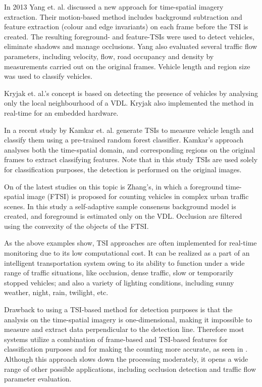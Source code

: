 In 2013 Yang et. al. discussed a new approach for time-spatial imagery extraction\cite{Yang2013a}.
Their motion-based method includes background subtraction and feature extraction (colour and edge invariants) on each frame before the TSI is created.
The resulting foreground- and feature-TSIs were used to detect vehicles, eliminate shadows and manage occlusions.
Yang also evaluated several traffic flow parameters, including velocity, flow, road occupancy and density by measurements carried out on the original frames. 
Vehicle length and region size was used to classify vehicles.

Kryjak et. al.'s concept is based on detecting the presence of vehicles by analysing only the local neighbourhood of a VDL.
Kryjak also implemented the method in real-time for an embedded hardware\cite{Kryjak2014}.

In a recent study by Kamkar et. al. generate TSIs to measure vehicle length and classify them using a pre-trained random forest classifier\cite{Kamkar2016}. 
Kamkar's approach analyses both the time-spatial domain, and corresponding regions on the original frames to extract classifying features.
Note that in this study TSIs are used solely for classification purposes, the detection is performed on the original images.

On of the latest studies on this topic is Zhang's, in which a foreground time-spatial image (FTSI) is proposed for counting vehicles in complex urban traffic scenes\cite{Zhang2016}.
In this study a self-adaptive sample consensus background model is created, and foreground is estimated only on the VDL.
Occlusion are filtered using the convexity of the objects of the FTSI.

As the above examples show, TSI approaches are often implemented for real-time monitoring due to its low computational cost.
It can be realized as a part of an intelligent transportation system owing to its ability to function under a wide range of traffic situations, like occlusion, dense traffic, slow or temporarily stopped vehicles; and also a variety of lighting conditions, including sunny weather, night, rain, twilight, etc.

Drawback to using a TSI-based method for detection purposes is that the analysis on the time-spatial imagery is one-dimensional, making it impossible to measure and extract data perpendicular to the detection line.
Therefore most systems utilize a combination of frame-based and TSI-based features for classification purposes and for making the counting more accurate, as seen in \cite{Kryjak2014, Yang2013a}. 
Although this approach slows down the processing moderately, it opens a wide range of other possible applications, including occlusion detection and traffic flow parameter evaluation.

